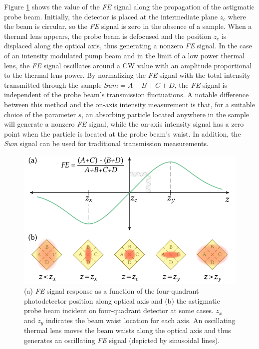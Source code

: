 \documentclass[9pt,twocolumn,twoside]{osajnl}
\newcommand{\FE}{\textit{FE}}
\newcommand{\Sum}{\textit{Sum}}
\begin{document}
Figure \ref{fig:FESignal} shows the value of the \FE{} signal along the propagation of the astigmatic probe beam. Initially, the detector is placed at the intermediate plane $z_c$ where the beam is circular, so the \FE{} signal is zero in the absence of a sample. When a thermal lens appears, the probe beam is defocused and the position $z_c$ is displaced along the optical axis, thus generating a nonzero \FE{} signal. In the case of an intensity modulated pump beam and in the limit of a low power thermal lens, the \FE{} signal oscillates around a CW value with an amplitude proportional to the thermal lens power. By normalizing the \FE{} signal with the total intensity transmitted through the sample $\Sum{} = A+B+C+D$, the \FE{} signal is independent of the probe beam's transmission fluctuations. A notable difference between this method and the on-axis intensity measurement is that, for a suitable choice of the parameter $s$, an absorbing particle located anywhere in the sample will generate a nonzero \FE{} signal, while the on-axis intensity signal has a zero point when the particle is located at the probe beam's waist. In addition, the \Sum{} signal can be used for traditional transmission measurements.

\begin{figure}[ht]
	\centering \includegraphics[width=.46\textwidth]{figures/FESignal.pdf}
	\caption{(a) \FE{} signal response as a function of the four-quadrant photodetector position along optical axis and (b) the astigmatic probe beam incident on four-quadrant detector at some cases. $z_x$ and $z_y$ indicates the beam waist location for each axis. An oscillating thermal lens moves the beam waists along the optical axis and thus generates an oscillating \FE{} signal (depicted by sinusoidal lines).}
	\label{fig:FESignal}
\end{figure}
\end{document}
